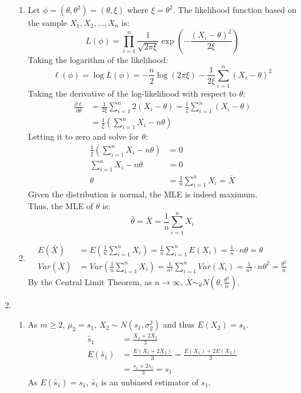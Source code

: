 \documentclass{article}
\begin{document}
\begin{enumerate}
\begin{enumerate}[label=(\roman*)]
    \item Let $\phi = (\theta, \theta^2) = (\theta, \xi)$ where $\xi = \theta^2$.
    The likelihood function based on the sample \(X_1, X_2, \dots, X_n\) is:
    \[
    L(\phi) = \prod_{i=1}^n \frac{1}{\sqrt{2\pi \xi}} \exp\left(-\frac{(X_i - \theta)^2}{2\xi}\right)
    \]
    Taking the logarithm of the likelihood:
    \[
    \ell(\phi) = \log L(\phi) = -\frac{n}{2} \log(2\pi \xi) - \frac{1}{2 \xi} \sum_{i=1}^n (X_i - \theta)^2
    \]
    Taking the derivative of the log-likelihood with respect to \(\theta\):
    \begin{align*}
    \frac{\partial \ell}{\partial \theta} &= \frac{1}{2 \xi} \sum_{i=1}^n 2(X_i - \theta) = \frac{1}{\xi} \sum_{i=1}^n (X_i - \theta) \\
    &= \frac{1}{\xi} \left( \sum_{i=1}^n X_i - n\theta \right)
    \end{align*}
    Letting it to zero and solve for \(\theta\):
    \begin{align*}
    \frac{1}{\xi} \left( \sum_{i=1}^n X_i - n\theta \right) &= 0 \\
    \sum_{i=1}^n X_i - n\theta &= 0 \\
    \theta &= \frac{1}{n} \sum_{i=1}^n X_i = \bar{X}
    \end{align*}
    Given the distribution is normal, the MLE is indeed maximum. \\
    Thus, the MLE of \(\theta\) is:
    \[
    \hat{\theta} = \bar{X} = \frac{1}{n} \sum_{i=1}^n X_i
    \]
    \item
    \begin{align*}
    E(\bar{X}) &= E\left( \frac{1}{n} \sum_{i=1}^n X_i \right) = \frac{1}{n} \sum_{i=1}^n E(X_i) = \frac{1}{n} \cdot n \theta = \theta \\
    Var(\bar{X}) &= Var\left( \frac{1}{n} \sum_{i=1}^n X_i \right) = \frac{1}{n^2} \sum_{i=1}^n Var(X_i) = \frac{1}{n^2} \cdot n \theta^2 = \frac{\theta^2}{n}
    \end{align*}
    By the Central Limit Theorem, as \( n \to \infty \), \( \bar{X} \sim_d N(\theta, \frac{\theta^2}{n}) \).
    \end{enumerate}

\item
    \begin{enumerate}[label=(\roman*)]
    \item As $m \geq 2$, $\mu_2 = s_1$, $X_2 \sim N(s_1, \sigma_2^2)$ and thus $E(X_2) = s_1$.
    \begin{align*}
    \tilde{s_1} &= \frac{X_1 + 2X_2}{3} \\
    E(\tilde{s_1}) &= \frac{E(X_1 + 2X_2)}{3} = \frac{E(X_1)+2E(X_2)}{3} \\
    &= \frac{s_1 + 2s_1}{3} = s_1
    \end{align*}
    As $E(\tilde{s_1}) = s_1$, $\tilde{s_1}$ is an unbiased estimator of $s_1$.


\end{enumerate}
\end{enumerate}
\end{document}
